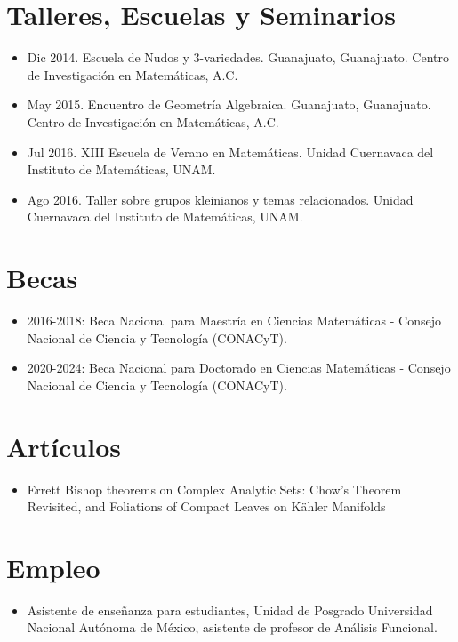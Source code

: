 \documentclass[11pt]{article}
\begin{document}
\section{Talleres, Escuelas y Seminarios}
\label{sec:orgbe9b13f}
\begin{itemize}
\item Dic 2014. Escuela de Nudos y 3-variedades. Guanajuato, Guanajuato. Centro de Investigación en Matemáticas, A.C.
\item May 2015. Encuentro de Geometría Algebraica. Guanajuato, Guanajuato. Centro de Investigación en Matemáticas, A.C.
\item Jul 2016. XIII Escuela de Verano en Matemáticas. Unidad Cuernavaca del Instituto de Matemáticas, UNAM.
\item Ago 2016. Taller sobre grupos kleinianos y temas relacionados. Unidad Cuernavaca del Instituto de Matemáticas, UNAM.
\end{itemize}

\section{Becas}
\label{sec:org40fd066}
\begin{itemize}
\item 2016-2018: Beca Nacional para Maestría en Ciencias Matemáticas - Consejo Nacional de Ciencia y Tecnología (CONACyT).

\item 2020-2024: Beca Nacional para Doctorado en Ciencias Matemáticas - Consejo Nacional de Ciencia y Tecnología (CONACyT).
\end{itemize}
\section{Artículos}
\label{sec:org7c0ea5c}
\begin{itemize}
\item Errett Bishop theorems on Complex Analytic Sets: Chow's Theorem Revisited, and Foliations of Compact Leaves on Kähler Manifolds
\end{itemize}
\section{Empleo}
\label{sec:org9c4ea42}
\begin{itemize}
\item Asistente de enseñanza para estudiantes, Unidad de Posgrado Universidad Nacional Autónoma de México, asistente de profesor de Análisis Funcional.
\end{itemize}
\end{document}
